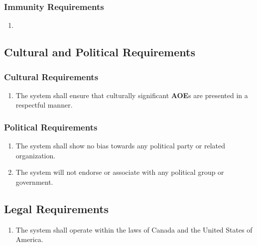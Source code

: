 \documentclass[titlepage]{article}
\begin{document}
\subsubsection{Immunity Requirements}
\label{ssub:immunity_requirements}
\begin{enumerate}[{SR}1. ]
	\item 
\end{enumerate}


\subsection{Cultural and Political Requirements}
\label{sub:cultural_and_political_requirements}

\subsubsection{Cultural Requirements}
\label{ssub:cultural_requirements}
\begin{enumerate}
	\item
	The system shall ensure that culturally significant \textbf{AOE}s are presented in a respectful manner.
\end{enumerate}

\subsubsection{Political Requirements}
\label{ssub:political_requirements}
\begin{enumerate}
	\item
	The system shall show no bias towards any political party or related organization.
	\item
	The system will not endorse or associate with any political group or government.
\end{enumerate}

\subsection{Legal Requirements}
\label{sub:legal_requirements}
\begin{enumerate}
\item
The system shall operate within the laws of Canada and the United States of America.
\end{enumerate}
\end{document}
